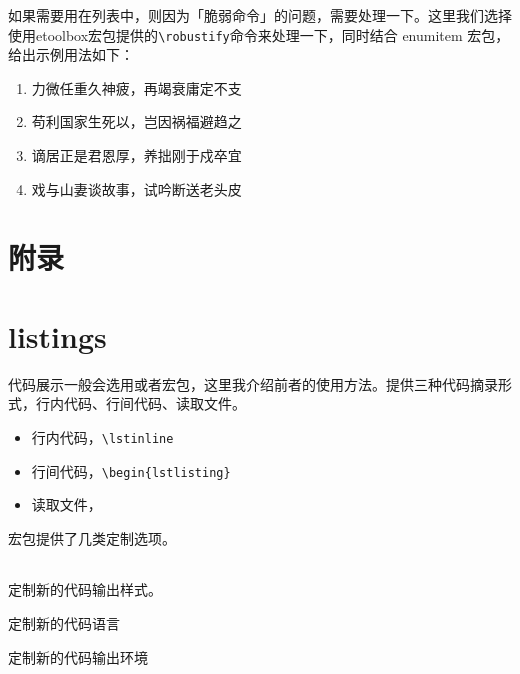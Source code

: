 如果需要用在列表中，则因为「脆弱命令」的问题，需要处理一下。这里我们选择使用etoolbox宏包提供的\lstinline|\robustify|命令来处理一下，同时结合 enumitem 宏包，给出示例用法如下：

\begin{codeshow}
\begin{enumerate}[label=\dcircled{\arabic*}, noitemsep]
    \item 力微任重久神疲，再竭衰庸定不支
    \item 苟利国家生死以，岂因祸福避趋之
    \item 谪居正是君恩厚，养拙刚于戍卒宜
    \item 戏与山妻谈故事，试吟断送老头皮
\end{enumerate}
\end{codeshow}


\section{附录}

\section{listings}

代码展示一般会选用或者宏包，这里我介绍前者的使用方法。提供三种代码摘录形式，行内代码、行间代码、读取文件。

\begin{itemize}
    \item 行内代码，\verb|\lstinline|
    \item 行间代码，\verb|\begin{lstlisting}|
    \item 读取文件，\verb||
\end{itemize}

宏包提供了几类定制选项。

\begin{table}[h]
    \begin{tabular}{ll}
        \toprule
        
        \midrule
        
        \bottomrule
    \end{tabular}
\end{table}

    定制新的代码输出样式。

    定制新的代码语言

    定制新的代码输出环境


